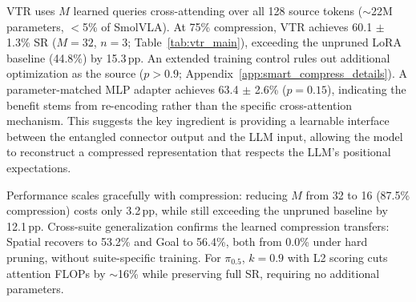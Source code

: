 VTR uses $M$ learned queries cross-attending over all 128 source tokens (${\sim}$22M parameters, $<$5\% of SmolVLA). At 75\% compression, VTR achieves 60.1 $\pm$ 1.3\% SR ($M{=}32$, $n{=}3$; Table~\ref{tab:vtr_main}), exceeding the unpruned LoRA baseline (44.8\%) by 15.3\,pp. An extended training control rules out additional optimization as the source ($p > 0.9$; Appendix~\ref{app:smart_compress_details}). A parameter-matched MLP adapter achieves 63.4 $\pm$ 2.6\% ($p{=}0.15$), indicating the benefit stems from re-encoding rather than the specific cross-attention mechanism. This suggests the key ingredient is providing a learnable interface between the entangled connector output and the LLM input, allowing the model to reconstruct a compressed representation that respects the LLM's positional expectations.

Performance scales gracefully with compression: reducing $M$ from 32 to 16 (87.5\% compression) costs only 3.2\,pp, while still exceeding the unpruned baseline by 12.1\,pp. Cross-suite generalization confirms the learned compression transfers: Spatial recovers to 53.2\% and Goal to 56.4\%, both from 0.0\% under hard pruning, without suite-specific training. For $\pi_{0.5}$, $k{=}0.9$ with L2 scoring cuts attention FLOPs by ${\sim}$16\% while preserving full SR, requiring no additional parameters.

